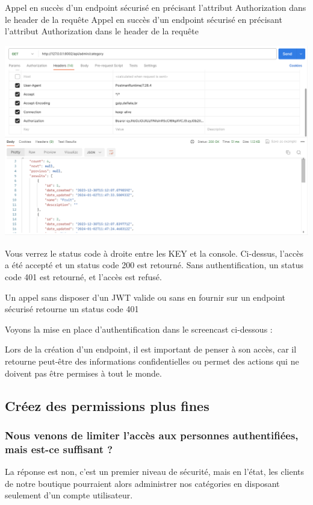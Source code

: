 \documentclass[a4paper]{article}
\begin{document}
Appel en succès d’un endpoint sécurisé en précisant l’attribut Authorization dans le header de la requête
Appel en succès d’un endpoint sécurisé en précisant l’attribut Authorization dans le header de la requête
\begin{center}
\includegraphics[width=15cm]{images/image25.png}
\end{center}

Vous verrez le status code à droite entre les KEY et la console. Ci-dessus, l'accès a été accepté et un status code 200 est retourné. Sans authentification, un status code 401 est retourné, et l’accès est {\color{monOrange}refusé}.

Un appel sans disposer d’un JWT valide ou sans en fournir sur un endpoint sécurisé retourne un status code 401


Voyons la mise en place d'authentification dans le screencast ci-dessous :

\begin{theorem}
Lors de la création d’un endpoint, il est important de penser à son accès, car il retourne peut-être des informations {\color{monOrange}confidentielles} ou permet des {\color{monOrange}actions} qui ne doivent pas être permises à tout le monde.
\end{theorem}

\subsection{Créez des permissions plus fines}
\subsubsection*{Nous venons de limiter l’accès aux personnes authentifiées, mais est-ce suffisant ?}
La réponse est non, c’est un {\color{monOrange}premier niveau de sécurité}, mais en l’état, les clients de notre boutique pourraient alors administrer nos catégories en disposant seulement d’un compte utilisateur.
\end{document}
